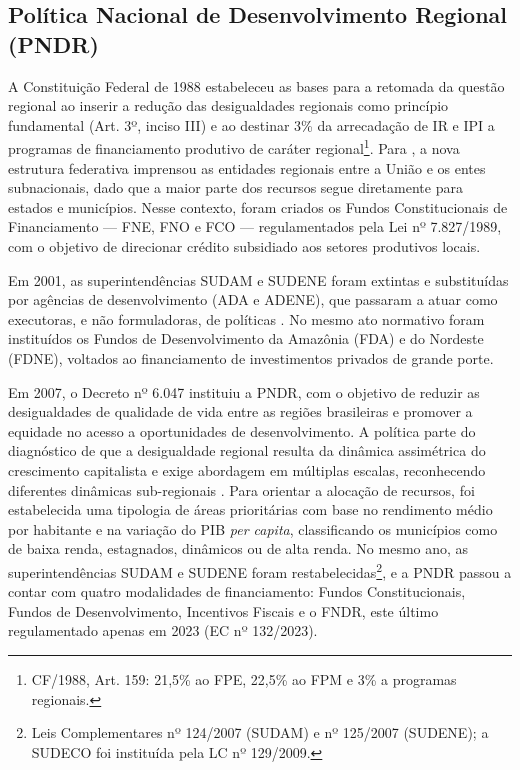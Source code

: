 \subsection{Política Nacional de Desenvolvimento Regional (PNDR)}
\label{subsec:pndr}

A Constituição Federal de 1988 estabeleceu as bases para a retomada da questão regional ao inserir a redução das desigualdades regionais como princípio fundamental (Art. 3º, inciso III) e ao destinar 3\% da arrecadação de IR e IPI a programas de financiamento produtivo de caráter regional\footnote{CF/1988, Art. 159: 21,5\% ao FPE, 22,5\% ao FPM e 3\% a programas regionais.}. Para , a nova estrutura federativa imprensou as entidades regionais entre a União e os entes subnacionais, dado que a maior parte dos recursos segue diretamente para estados e municípios. Nesse contexto, foram criados os Fundos Constitucionais de Financiamento --- FNE, FNO e FCO --- regulamentados pela Lei nº 7.827/1989, com o objetivo de direcionar crédito subsidiado aos setores produtivos locais.

Em 2001, as superintendências SUDAM e SUDENE foram extintas e substituídas por agências de desenvolvimento (ADA e ADENE), que passaram a atuar como executoras, e não formuladoras, de políticas \cite{Portugal2020}. No mesmo ato normativo foram instituídos os Fundos de Desenvolvimento da Amazônia (FDA) e do Nordeste (FDNE), voltados ao financiamento de investimentos privados de grande porte.

Em 2007, o Decreto nº 6.047 instituiu a PNDR, com o objetivo de reduzir as desigualdades de qualidade de vida entre as regiões brasileiras e promover a equidade no acesso a oportunidades de desenvolvimento. A política parte do diagnóstico de que a desigualdade regional resulta da dinâmica assimétrica do crescimento capitalista e exige abordagem em múltiplas escalas, reconhecendo diferentes dinâmicas sub-regionais \cite{Brasil2006}. Para orientar a alocação de recursos, foi estabelecida uma tipologia de áreas prioritárias com base no rendimento médio por habitante e na variação do PIB \textit{per capita}, classificando os municípios como de baixa renda, estagnados, dinâmicos ou de alta renda. No mesmo ano, as superintendências SUDAM e SUDENE foram restabelecidas\footnote{Leis Complementares nº 124/2007 (SUDAM) e nº 125/2007 (SUDENE); a SUDECO foi instituída pela LC nº 129/2009.}, e a PNDR passou a contar com quatro modalidades de financiamento: Fundos Constitucionais, Fundos de Desenvolvimento, Incentivos Fiscais e o FNDR, este último regulamentado apenas em 2023 (EC nº 132/2023).

